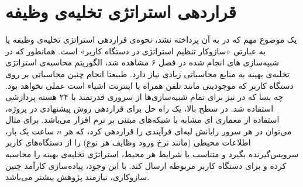 \section{قراردهی استراتژی تخلیه‌ی وظیفه}
یک موضوع مهم که در \CurrentProject به آن پرداخته نشد، نحوه‌ی قراردهی استراتژی تخلیه‌ی وظیفه یا به عبارتی «سازوکار تنظیم استراتژی در دستگاه کاربر» است. همانطور که در شبیه‌سازی های انجام شده در فصل ۶ مشاهده شد، الگوریتم محاسبه‌ی استراتژی تخلیه‌ی بهینه به منابع محاسباتی زیادی نیاز دارد. طبیعتا انجام چنین محاسباتی بر روی دستگاه کاربر که موجودیتی مانند تلفن همراه یا اینترنت اشیاء است عملی نخواهد بود. چه بسا که در \CurrentProject نیز برای تمام شبیه‌سازی‌ها از سروری قدرتمند با ۲۴ هسته پردازشی استفاده شد. در سطح بالا، یک راه حل برای قراردهی روش پیشنهادی در پروژه، استفاده از معماری ای مشابه با شبکه‌های مبتنی بر نرم افزار می‌باشد. برای مثال می‌توان در هر سرور رایانش لبه‌ای فرآیندی را قراردهی کرد، که هر $n$ ساعت یک بار، اطلاعات محیطی (مانند نرخ ورود وظایف هر نوع) را از دستگاه‌های کاربر سرویس‌گیرنده بگیرد و متناسب با شرایط هر محیط، استراتژی تخلیه‌ی بهینه را محاسبه کرده و برای دستگاه کاربر مربوطه ارسال کند. با این وجود، پیاده‌سازی کارآمد چنین سازوکاری، نیازمند پژوهش بیشتر می‌باشد.
\clearpage